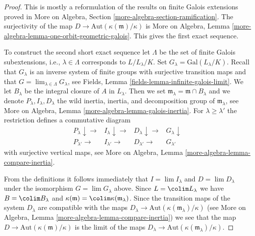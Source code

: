 \begin{proof}
This is mostly a reformulation of the results on finite Galois extensions
proved in More on Algebra, Section \ref{more-algebra-section-ramification}.
The surjectivity of the map $D \to \text{Aut}(\kappa(\mathfrak m)/\kappa)$ is
More on Algebra, Lemma \ref{more-algebra-lemma-one-orbit-geometric-galois}.
This gives the first exact sequence.

\medskip\noindent
To construct the second short exact sequence let $\Lambda$ be the set
of finite Galois subextensions, i.e., $\lambda \in \Lambda$ corresponds
to $L/L_\lambda/K$. Set $G_\lambda = \text{Gal}(L_\lambda/K)$.
Recall that $G_\lambda$ is an inverse system of finite groups with surjective
transition maps and that $G = \lim_{\lambda \in \Lambda} G_\lambda$, see
Fields, Lemma \ref{fields-lemma-infinite-galois-limit}.
We let $B_\lambda$ be the integral closure of $A$ in $L_\lambda$.
Then we set $\mathfrak m_\lambda = \mathfrak m \cap B_\lambda$
and we denote $P_\lambda, I_\lambda, D_\lambda$ the
wild inertia, inertia, and decomposition group of
$\mathfrak m_\lambda$, see More on Algebra, Lemma
\ref{more-algebra-lemma-galois-inertia}.
For $\lambda \geq \lambda'$ the restriction defines
a commutative diagram
$$
\begin{array}{cccc}P_\lambda \downarrow\longrightarrow & I_\lambda \downarrow\longrightarrow & D_\lambda \downarrow\longrightarrow & G_\lambda \downarrow \\ P_{\lambda'} \longrightarrow & I_{\lambda'} \longrightarrow & D_{\lambda'} \longrightarrow & G_{\lambda'}\end{array}
$$
with surjective vertical maps, see
More on Algebra, Lemma \ref{more-algebra-lemma-compare-inertia}.

\medskip\noindent
From the definitions it follows immediately
that $I = \lim I_\lambda$ and $D = \lim D_\lambda$
under the isomorphism $G = \lim G_\lambda$ above.
Since $L = \colim L_\lambda$ we have $B = \colim B_\lambda$
and $\kappa(\mathfrak m) = \colim \kappa(\mathfrak m_\lambda)$.
Since the transition maps of the system $D_\lambda$
are compatible with the maps
$D_\lambda \to \text{Aut}(\kappa(\mathfrak m_\lambda)/\kappa)$
(see More on Algebra, Lemma \ref{more-algebra-lemma-compare-inertia})
we see that the map $D \to \text{Aut}(\kappa(\mathfrak m)/\kappa)$
is the limit of the maps
$D_\lambda \to \text{Aut}(\kappa(\mathfrak m_\lambda)/\kappa)$.


\end{proof}
